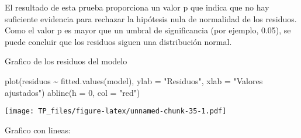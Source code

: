 \documentclass[
]{article}
\newenvironment{Shaded}{\begin{snugshade}}{\end{snugshade}}
\newcommand{\AttributeTok}[1]{\textcolor[rgb]{0.77,0.63,0.00}{#1}}
\newcommand{\DecValTok}[1]{\textcolor[rgb]{0.00,0.00,0.81}{#1}}
\newcommand{\FloatTok}[1]{\textcolor[rgb]{0.00,0.00,0.81}{#1}}
\newcommand{\FunctionTok}[1]{\textcolor[rgb]{0.00,0.00,0.00}{#1}}
\newcommand{\NormalTok}[1]{#1}
\newcommand{\OtherTok}[1]{\textcolor[rgb]{0.56,0.35,0.01}{#1}}
\newcommand{\SpecialCharTok}[1]{\textcolor[rgb]{0.00,0.00,0.00}{#1}}
\newcommand{\StringTok}[1]{\textcolor[rgb]{0.31,0.60,0.02}{#1}}
\begin{document}
{El resultado de esta prueba proporciona un valor p que indica que no
hay suficiente evidencia para rechazar la hipótesis nula de normalidad
de los residuos. Como el valor p es mayor que un umbral de significancia
(por ejemplo, 0.05), se puede concluir que los residuos siguen una
distribución normal.}

Grafico de los residuos del modelo

\begin{Shaded}
\begin{Highlighting}[]
\FunctionTok{plot}\NormalTok{(residuos }\SpecialCharTok{\textasciitilde{}} \FunctionTok{fitted.values}\NormalTok{(model), }\AttributeTok{ylab =} \StringTok{"Residuos"}\NormalTok{, }\AttributeTok{xlab =} \StringTok{"Valores ajustados"}\NormalTok{)}
\FunctionTok{abline}\NormalTok{(}\AttributeTok{h =} \DecValTok{0}\NormalTok{, }\AttributeTok{col =} \StringTok{"red"}\NormalTok{)}
\end{Highlighting}
\end{Shaded}

\texttt{[image: TP\_files/figure-latex/unnamed-chunk-35-1.pdf]}

Grafico con lineas:

\begin{Shaded}
\end{Shaded}
\end{document}

